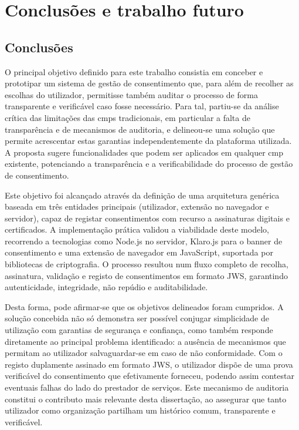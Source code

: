 \chapter{Conclusões e trabalho futuro}
\label{cap:conclusoes}

\section{Conclusões}

O principal objetivo definido para este trabalho consistia em conceber e prototipar um sistema de gestão de consentimento que, para além de recolher as escolhas do utilizador, permitisse também auditar o processo de forma transparente e verificável caso fosse necessário. Para tal, partiu-se da análise crítica das limitações das \acrshort{cmp}s tradicionais, em particular a falta de transparência e de mecanismos de auditoria, e delineou-se uma solução que permite acrescentar estas garantias independentemente da plataforma utilizada. A proposta sugere funcionalidades que podem ser aplicados em qualquer \acrshort{cmp} existente, potenciando a transparência e a verificabilidade do processo de gestão de consentimento.

Este objetivo foi alcançado através da definição de uma arquitetura genérica baseada em três entidades principais (utilizador, extensão no navegador e servidor), capaz de registar consentimentos com recurso a assinaturas digitais e certificados. A implementação prática validou a viabilidade deste modelo, recorrendo a tecnologias como Node.js no servidor, Klaro.js para o banner de consentimento e uma extensão de navegador em JavaScript, suportada por bibliotecas de criptografia. O processo resultou num fluxo completo de recolha, assinatura, validação e registo de consentimentos em formato JWS, garantindo autenticidade, integridade, não repúdio e auditabilidade.

Desta forma, pode afirmar-se que os objetivos delineados foram cumpridos. A solução concebida não só demonstra ser possível conjugar simplicidade de utilização com garantias de segurança e confiança, como também responde diretamente ao principal problema identificado: a ausência de mecanismos que permitam ao utilizador salvaguardar-se em caso de não conformidade. Com o registo duplamente assinado em formato JWS, o utilizador dispõe de uma prova verificável do consentimento que efetivamente forneceu, podendo assim contestar eventuais falhas do lado do prestador de serviços. Este mecanismo de auditoria constitui o contributo mais relevante desta dissertação, ao assegurar que tanto utilizador como organização partilham um histórico comum, transparente e verificável.

